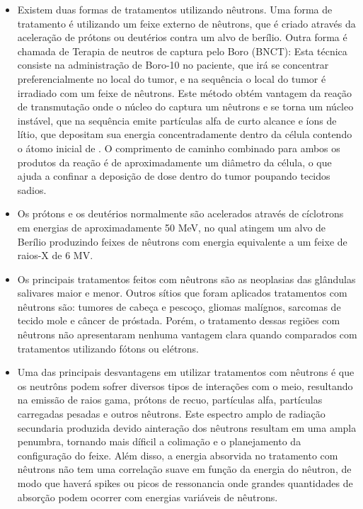 \documentclass[11pt,a4paper]{article}
\newcounter{exemplo}
\begin{document}
\begin{exemplo}
\begin{itemize}
        \item Existem duas formas de tratamentos utilizando nêutrons. Uma forma de tratamento é utilizando um feixe externo de nêutrons, que é criado através da aceleração de prótons ou deutérios contra um alvo de berílio. Outra forma é chamada de Terapia de neutros de captura pelo Boro (BNCT): Esta técnica consiste na administração de Boro-10 no paciente, que irá se concentrar preferencialmente no local do tumor, e na sequência o local do tumor é irradiado com um feixe de nêutrons. Este método obtém vantagem da reação de transmutação onde o núcleo do  captura um nêutrons e se torna um núcleo instável, que na sequência emite partículas alfa de curto alcance e íons de lítio, que depositam sua energia concentradamente dentro da célula contendo o átomo inicial de . O comprimento de caminho combinado para ambos os produtos da reação é de aproximadamente um diâmetro da célula, o que ajuda a confinar a deposição de dose dentro do tumor poupando tecidos sadios. 
        
        \item Os prótons e os deutérios normalmente são acelerados através de cíclotrons em energias de aproximadamente 50 MeV, no qual atingem um alvo de Berílio produzindo feixes de nêutrons com energia equivalente a um feixe de raios-X de 6 MV.
        
        \item Os principais tratamentos feitos com nêutrons são as neoplasias das glândulas salivares maior e menor. Outros sítios que foram aplicados tratamentos com nêutrons são: tumores de cabeça e pescoço, gliomas malígnos, sarcomas de tecido mole e câncer de próstada. Porém, o tratamento dessas regiões com nêutrons não apresentaram nenhuma vantagem clara quando comparados com tratamentos utilizando fótons ou elétrons.
        
        \item Uma das principais desvantagens em utilizar tratamentos com nêutrons é que os neutrôns podem sofrer diversos tipos de interações com o meio, resultando na emissão de raios gama, prótons de recuo, partículas alfa, partículas carregadas pesadas e outros nêutrons. Este espectro amplo de radiação secundaria produzida devido ainteração dos nêutrons resultam em uma ampla penumbra, tornando mais díficil a colimação e o planejamento da configuração do feixe. Além disso, a energia absorvida no tratamento com nêutrons não tem uma correlação suave em função da energia do nêutron, de modo que haverá spikes ou picos de ressonancia onde grandes quantidades de absorção podem ocorrer com energias variáveis de nêutrons.
    \end{itemize}


\end{exemplo}
\end{document}
